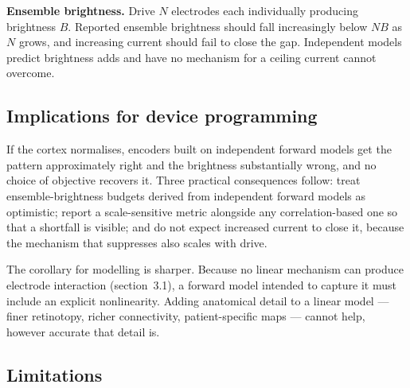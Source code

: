 \documentclass[10pt,twocolumn]{article}
\begin{document}
\textbf{Ensemble brightness.} Drive $N$ electrodes each individually
producing brightness $B$. Reported ensemble brightness should fall
increasingly below $NB$ as $N$ grows, and increasing current should fail to
close the gap. Independent models predict brightness adds and have no
mechanism for a ceiling current cannot overcome.

\subsection{Implications for device programming}

If the cortex normalises, encoders built on independent forward models get
the pattern approximately right and the brightness substantially wrong, and
no choice of objective recovers it. Three practical consequences follow:
treat ensemble-brightness budgets derived from independent forward models as
optimistic; report a scale-sensitive metric alongside any correlation-based
one so that a shortfall is visible; and do not expect increased current to
close it, because the mechanism that suppresses also scales with drive.

The corollary for modelling is sharper. Because no linear mechanism can
produce electrode interaction (section~3.1), a forward model intended to
capture it must include an explicit nonlinearity. Adding anatomical detail
to a linear model --- finer retinotopy, richer connectivity,
patient-specific maps --- cannot help, however accurate that detail is.

\subsection{Limitations}
\end{document}
